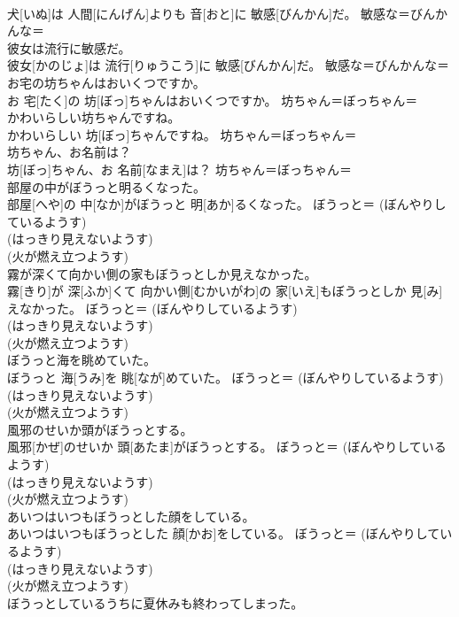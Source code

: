 \documentclass[8pt]{extreport}
\begin{document}
\begin{CJK}{UTF8}{min}
{\\	犬[いぬ]は 人間[にんげん]よりも 音[おと]に 敏感[びんかん]だ。	敏感な＝びんかんな＝ 
\\	彼女は流行に敏感だ。	
\\	彼女[かのじょ]は 流行[りゅうこう]に 敏感[びんかん]だ。	敏感な＝びんかんな＝ 
\\	お宅の坊ちゃんはおいくつですか。	
\\	お 宅[たく]の 坊[ぼっ]ちゃんはおいくつですか。	坊ちゃん＝ぼっちゃん＝ 
\\	かわいらしい坊ちゃんですね。	
\\	かわいらしい 坊[ぼっ]ちゃんですね。	坊ちゃん＝ぼっちゃん＝ 
\\	坊ちゃん、お名前は？	
\\	坊[ぼっ]ちゃん、お 名前[なまえ]は？	坊ちゃん＝ぼっちゃん＝ 
\\	部屋の中がぼうっと明るくなった。	
\\	部屋[へや]の 中[なか]がぼうっと 明[あか]るくなった。	ぼうっと＝ (ぼんやりしているようす) 
\\	(はっきり見えないようす) 
\\	(火が燃え立つようす) 
\\	霧が深くて向かい側の家もぼうっとしか見えなかった。	
\\	霧[きり]が 深[ふか]くて 向かい側[むかいがわ]の 家[いえ]もぼうっとしか 見[み]えなかった。	ぼうっと＝ (ぼんやりしているようす) 
\\	(はっきり見えないようす) 
\\	(火が燃え立つようす) 
\\	ぼうっと海を眺めていた。	
\\	ぼうっと 海[うみ]を 眺[なが]めていた。	ぼうっと＝ (ぼんやりしているようす) 
\\	(はっきり見えないようす) 
\\	(火が燃え立つようす) 
\\	風邪のせいか頭がぼうっとする。	
\\	風邪[かぜ]のせいか 頭[あたま]がぼうっとする。	ぼうっと＝ (ぼんやりしているようす) 
\\	(はっきり見えないようす) 
\\	(火が燃え立つようす) 
\\	あいつはいつもぼうっとした顔をしている。	
\\	あいつはいつもぼうっとした 顔[かお]をしている。	ぼうっと＝ (ぼんやりしているようす) 
\\	(はっきり見えないようす) 
\\	(火が燃え立つようす) 
\\	ぼうっとしているうちに夏休みも終わってしまった。	
}
\end{CJK}
\end{document}
